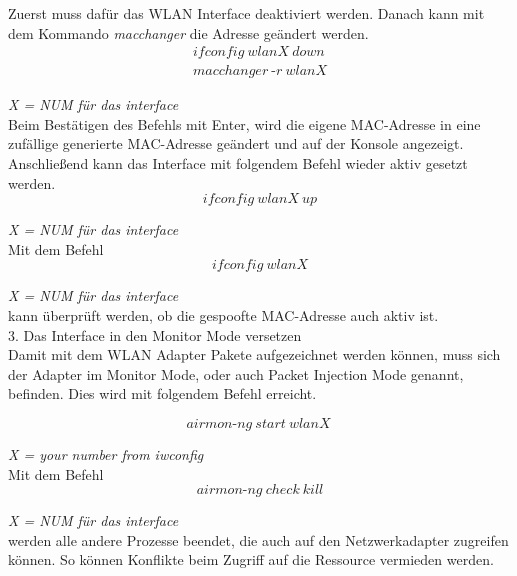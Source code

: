 Zuerst muss dafür das WLAN Interface deaktiviert werden. Danach kann mit dem Kommando \textit{macchanger} die Adresse geändert werden.\\

\begin{equation*}
\begin{split}
ifconfig~wlanX~down\\
macchanger~\text{-}r~wlanX
\end{split}
\end{equation*}

\textit{X = NUM für das interface}\\

Beim Bestätigen des Befehls mit Enter, wird die eigene MAC-Adresse in eine zufällige generierte MAC-Adresse geändert und auf der Konsole angezeigt. Anschließend kann das Interface mit folgendem Befehl wieder aktiv gesetzt werden.\\
 
$$ifconfig~wlanX~up$$

\textit{X = NUM für das interface}\\


Mit dem Befehl\\ 
$$ifconfig~wlanX$$

\textit{X = NUM für das interface}\\

kann überprüft werden, ob die gespoofte MAC-Adresse auch aktiv ist.\\

{\Large 3. Das Interface in den Monitor Mode versetzen}\\

Damit mit dem WLAN Adapter Pakete aufgezeichnet werden können, muss sich der Adapter im Monitor Mode, oder auch Packet Injection Mode genannt, befinden. Dies wird mit folgendem Befehl erreicht.

$$airmon\text{-}ng~start~wlanX~$$

\textit{X = your number from iwconfig}\\

Mit dem Befehl\\ 

$$airmon\text{-}ng~check~kill$$

\textit{X = NUM für das interface}\\


werden alle andere Prozesse beendet, die auch auf den Netzwerkadapter zugreifen können. So können Konflikte beim Zugriff auf die Ressource vermieden werden.\\

